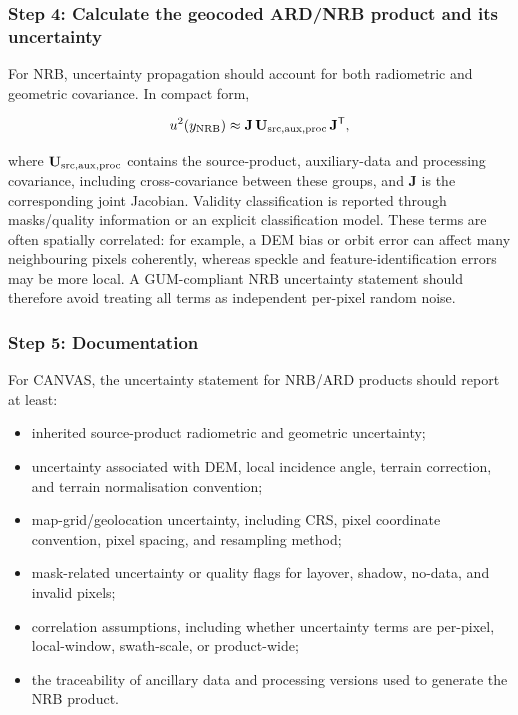 \subsubsection{Step 4: Calculate the geocoded ARD/NRB product and its uncertainty}

For \ac{NRB}, uncertainty propagation should account for both radiometric and geometric covariance. In compact form,

\begin{equation}
  u^2\!\left(y_{\rm NRB}\right) \approx
  \mathbf J\,\mathbf U_{\rm src,aux,proc}\,\mathbf J^{\mathsf T},
  \label{eq:nrb_uncertainty_proposed}
\end{equation}


where $\mathbf U_{\rm src,aux,proc}$ contains the source-product, auxiliary-data
and processing covariance, including cross-covariance between these groups,
and $\mathbf J$ is the corresponding joint Jacobian. Validity classification
is reported through masks/quality information or an explicit classification
model.
These terms are often spatially correlated: for example, a \ac{DEM} bias or orbit error can affect many neighbouring pixels coherently, whereas speckle and feature-identification errors may be more local. A \ac{GUM}-compliant \ac{NRB} uncertainty statement should therefore avoid treating all terms as independent per-pixel random noise.

\subsubsection{Step 5: Documentation}

For CANVAS, the uncertainty statement for \ac{NRB}/\ac{ARD} products should report at least:
\begin{itemize}
  \item inherited source-product radiometric and geometric uncertainty;
  \item uncertainty associated with \ac{DEM}, local incidence angle, terrain correction, and terrain normalisation convention;
  \item map-grid/geolocation uncertainty, including CRS, pixel coordinate convention, pixel spacing, and resampling method;
  \item mask-related uncertainty or quality flags for layover, shadow, no-data, and invalid pixels;
  \item correlation assumptions, including whether uncertainty terms are per-pixel, local-window, swath-scale, or product-wide;
  \item the traceability of ancillary data and processing versions used to generate the \ac{NRB} product.
\end{itemize}

